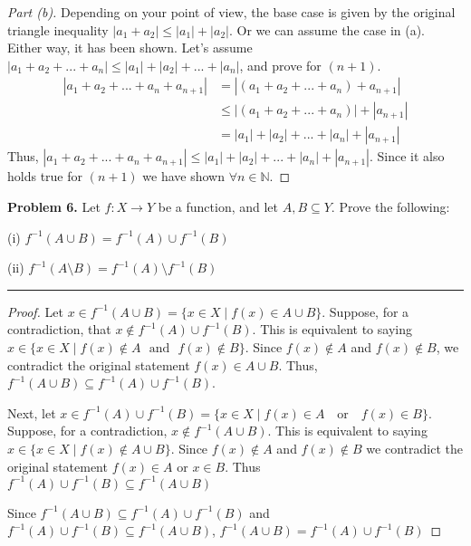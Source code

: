 \documentclass[leqno]{article}
\theoremstyle{nonumberplain}
\newtheorem{proof}{Proof}
\begin{document}
\begin{proof}[Part (b)] Depending on your point of view, the base case is given by the original triangle inequality $|a_1 + a_2| \leq |a_1|+|a_2|$.  Or we can assume the case in (a).  Either way, it has been shown.  Let's assume $|a_1 + a_2 +... +a_n| \leq |a_1| +|a_2| + ... + |a_n|$, and prove for $(n+1)$.  
\begin{align*}
|a_1 + a_2 + ... + a_n + a_{n+1}| &= |(a_1 + a_2 + ... + a_n) + a_{n+1}|\\
&\leq |(a_1 + a_2 + ... + a_n)|+|a_{n+1}|\\
&= |a_1|+|a_2|+...+|a_n|+|a_{n+1}|
\end{align*}
Thus, $|a_1 + a_2 + ... +a_n + a_{n+1}|\leq |a_1|+|a_2|+...+|a_n|+|a_{n+1}|$.  Since it also holds true for $(n+1)$ we have shown $\forall n \in \mathbb{N}$.
\end{proof}

\pagebreak




\noindent\textbf{Problem 6.} Let $f \colon X \to Y$ be a function, and let $A, B \subseteq Y$. Prove the following:

(i) $f^{-1}(A \cup B) = f^{-1}(A)\cup f^{-1}(B)$

(ii) $f^{-1}(A\setminus B) = f^{-1}(A) \setminus f^{-1}(B)$

\noindent\rule[0.5ex]{\linewidth}{1pt}

\begin{proof}
Let $x \in f^{-1}(A \cup B)=\{x \in X \mid f(x)\in A \cup B \}$. Suppose, for a contradiction, that $x \notin f^{-1}(A) \cup f^{-1}(B)$.  This is equivalent to saying $x\in \{x \in X \mid f(x)\notin A \textrm{~ and ~} f(x) \notin B\}$.  Since $f(x)\notin A$ and $f(x) \notin B$, we contradict the original statement $f(x)\in A \cup B$.  Thus, $f^{-1}(A \cup B) \subseteq f^{-1}(A) \cup f^{-1}(B)$.

Next, let $x \in f^{-1}(A) \cup f^{-1}(B)=\{x\in X \mid f(x) \in A \textrm{~~ or ~~} f(x)\in B\}$.  Suppose, for a contradiction, $x \notin f^{-1}(A \cup B)$.  This is equivalent to saying $x \in \{x \in X \mid f(x)\notin A \cup B\}$.  Since $f(x) \notin A$ and $f(x) \notin B$ we contradict the original statement $f(x)\in A$ or $x\in B$.  Thus $f^{-1}(A) \cup f^{-1}(B) \subseteq  f^{-1}(A \cup B)$

Since $f^{-1}(A \cup B) \subseteq f^{-1}(A) \cup f^{-1}(B)$ and $f^{-1}(A) \cup f^{-1}(B) \subseteq  f^{-1}(A \cup B)$, $f^{-1}(A \cup B) = f^{-1}(A) \cup f^{-1}(B)$
\end{proof}
\end{document}
